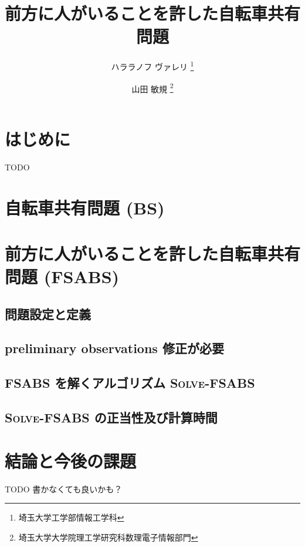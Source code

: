 \documentclass{la-preprint}
\title{前方に人がいることを許した自転車共有問題}
\author{
	ハララノフ ヴァレリ \thanks{埼玉大学工学部情報工学科} \and
	山田 敏規 \thanks{埼玉大学大学院理工学研究科数理電子情報部門} \and
}
\date{}
\begin{document}
\section{はじめに}
TODO
\section{自転車共有問題 (BS)}

\section{前方に人がいることを許した自転車共有問題 (FSABS) }
\subsection{問題設定と定義}

\subsection{preliminary observations {\color{red}修正が必要}}

\subsection{FSABS を解くアルゴリズム \textsc{Solve-FSABS}}

\subsection{\textsc{Solve-FSABS} の正当性及び計算時間}

\section{結論と今後の課題}
TODO
書かなくても良いかも？


\end{document}
